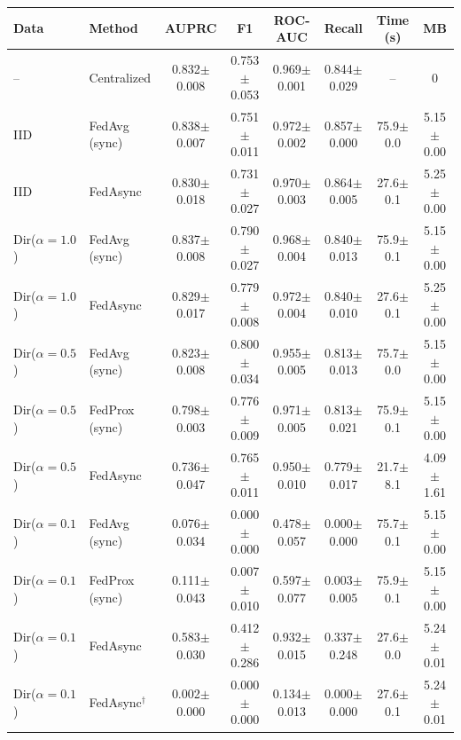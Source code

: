 \begin{tabular}{llcccccc}
\toprule
Data & Method & AUPRC & F1 & ROC-AUC & Recall & Time (s) & MB \\
\midrule
-- & Centralized & 0.832$\pm$0.008 & 0.753$\pm$0.053 & 0.969$\pm$0.001 & 0.844$\pm$0.029 & -- & 0 \\
\midrule
IID & FedAvg (sync) & 0.838$\pm$0.007 & 0.751$\pm$0.011 & 0.972$\pm$0.002 & 0.857$\pm$0.000 & 75.9$\pm$0.0 & 5.15$\pm$0.00 \\
IID & FedAsync & 0.830$\pm$0.018 & 0.731$\pm$0.027 & 0.970$\pm$0.003 & 0.864$\pm$0.005 & 27.6$\pm$0.1 & 5.25$\pm$0.00 \\
\midrule
Dir($\alpha{=}1.0$) & FedAvg (sync) & 0.837$\pm$0.008 & 0.790$\pm$0.027 & 0.968$\pm$0.004 & 0.840$\pm$0.013 & 75.9$\pm$0.1 & 5.15$\pm$0.00 \\
Dir($\alpha{=}1.0$) & FedAsync & 0.829$\pm$0.017 & 0.779$\pm$0.008 & 0.972$\pm$0.004 & 0.840$\pm$0.010 & 27.6$\pm$0.1 & 5.25$\pm$0.00 \\
\midrule
Dir($\alpha{=}0.5$) & FedAvg (sync) & 0.823$\pm$0.008 & 0.800$\pm$0.034 & 0.955$\pm$0.005 & 0.813$\pm$0.013 & 75.7$\pm$0.0 & 5.15$\pm$0.00 \\
Dir($\alpha{=}0.5$) & FedProx (sync) & 0.798$\pm$0.003 & 0.776$\pm$0.009 & 0.971$\pm$0.005 & 0.813$\pm$0.021 & 75.9$\pm$0.1 & 5.15$\pm$0.00 \\
Dir($\alpha{=}0.5$) & FedAsync & 0.736$\pm$0.047 & 0.765$\pm$0.011 & 0.950$\pm$0.010 & 0.779$\pm$0.017 & 21.7$\pm$8.1 & 4.09$\pm$1.61 \\
\midrule
Dir($\alpha{=}0.1$) & FedAvg (sync) & 0.076$\pm$0.034 & 0.000$\pm$0.000 & 0.478$\pm$0.057 & 0.000$\pm$0.000 & 75.7$\pm$0.1 & 5.15$\pm$0.00 \\
Dir($\alpha{=}0.1$) & FedProx (sync) & 0.111$\pm$0.043 & 0.007$\pm$0.010 & 0.597$\pm$0.077 & 0.003$\pm$0.005 & 75.9$\pm$0.1 & 5.15$\pm$0.00 \\
Dir($\alpha{=}0.1$) & FedAsync & 0.583$\pm$0.030 & 0.412$\pm$0.286 & 0.932$\pm$0.015 & 0.337$\pm$0.248 & 27.6$\pm$0.0 & 5.24$\pm$0.01 \\
Dir($\alpha{=}0.1$) & FedAsync$^\dagger$ & 0.002$\pm$0.000 & 0.000$\pm$0.000 & 0.134$\pm$0.013 & 0.000$\pm$0.000 & 27.6$\pm$0.1 & 5.24$\pm$0.01 \\
\bottomrule
\end{tabular}
